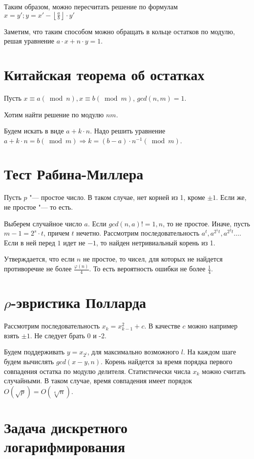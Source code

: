\documentclass[12pt,a4paper]{article}
\theoremstyle{plain}
\begin{document}
Таким образом, можно пересчитать решение по формулам $x = y'; y = x' - \left\lfloor \frac{a}{b}\right\rfloor \cdot y'$

Заметим, что таким способом можно обращать в кольце остатков по модулю, решая уравнение
$a \cdot x + n \cdot y = 1$.

\section{Китайская теорема об остатках}

Пусть $x \equiv a (\bmod n), x \equiv b (\bmod m)$, $gcd(n, m) = 1$.

Хотим найти решение по модулю $nm$.

Будем искать в виде $a + k \cdot n$.
Надо решить уравнение $a + k \cdot n = b (\bmod m) \Rightarrow k = (b - a) \cdot n^{-1} (\bmod m)$. 

\section{Тест Рабина-Миллера}

Пусть $p$ "--- простое число. В таком случае, нет корней из 1, кроме $\pm 1$.
Если же, не простое "--- то есть.

Выберем случайное число $a$. Если $gcd(n, a) != 1, n$, то не простое.
Иначе, пусть $m - 1 = 2^s \cdot t$, причем $t$ нечетно.
Рассмотрим последовательность $a^t, a^{2^1t}, a^{2^2t} \dots$.
Если в ней перед $1$ идет не $-1$, то найден нетривиальный корень из 1.

Утверждается, что если $n$ не простое, то чисел, для которых не найдется
противоречие не более $\frac{\varphi(n)}{4}$. То есть вероятность ошибки не более $\frac{1}{4}$.

\section{$\rho$-эвристика Полларда}

Рассмотрим последовательность $x_k = x_{k-1}^2 + c$.
В качестве $c$ можно например взять $\pm 1$. Не следует брать
0 и -2.

Будем поддерживать $y = x_{2^l}$, для максимально возможного $l$.
На каждом шаге будем вычислять $gcd(x - y, n)$. 
Корень найдется за время порядка первого совпадения остатка по модулю делителя.
Статистически числа $x_k$ можно считать случайными. В таком случае, 
время совпадения имеет порядок $O(\sqrt{p}) = O(\sqrt[4]{n})$.

\section{Задача дискретного логарифмирования}
\end{document}
